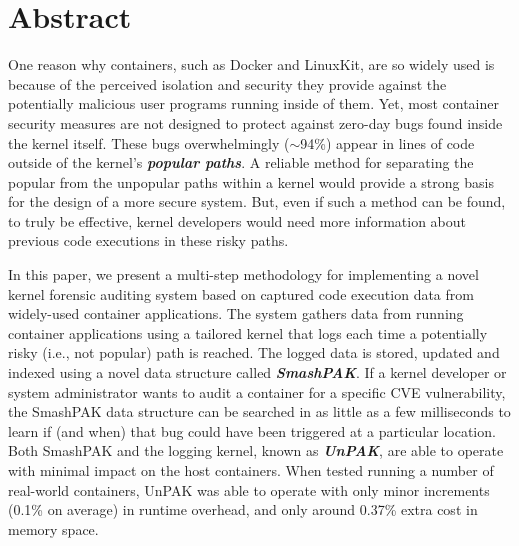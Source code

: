 \section*{Abstract}
One reason why containers, such as Docker and LinuxKit, are so widely used is because of the perceived isolation 
and security they provide against the potentially malicious user programs running inside of them. 
Yet, most container security measures are not designed to protect against zero-day bugs found inside the kernel itself. 
These bugs overwhelmingly ($\sim$94\%) appear in lines of code outside of the kernel’s \textbf{\textit{popular paths}}. 
A reliable method for separating the popular from the unpopular paths within a kernel would provide a strong basis for the design of a more secure system. 
But, even if such a method can be found,  to truly be effective, kernel developers would need more information about previous code executions in these risky paths.

In this paper, we present a multi-step methodology for implementing a novel kernel forensic auditing system based on captured code execution data from widely-used container applications.  
The system gathers data from running container applications using a tailored kernel that logs each time a potentially risky (i.e., not popular) path is reached. 
The logged data is stored, updated and indexed using a novel data structure called \textbf{\textit{SmashPAK}}. 
If a kernel developer or system administrator wants to audit a container for a specific CVE vulnerability, 
the SmashPAK data structure can be searched in as little as a few milliseconds to learn if (and when) that bug  could have been triggered at a particular location. 
Both SmashPAK and the logging kernel, known as \textbf{\textit{UnPAK}}, are able to operate with minimal impact on the host containers. 
When tested running a number of real-world containers, UnPAK was able to operate with only minor increments (0.1\% on average) in runtime overhead, and only around 0.37\% extra cost in memory space.